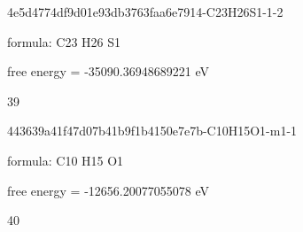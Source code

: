 \documentclass{article}
\begin{document}
\vspace{1cm}


4e5d4774df9d01e93db3763faa6e7914-C23H26S1-1-2



formula: C23 H26 S1



free energy = -35090.36948689221 eV

39

\vspace{1cm}


443639a41f47d07b41b9f1b4150e7e7b-C10H15O1-m1-1



formula: C10 H15 O1



free energy = -12656.20077055078 eV

40
\end{document}

